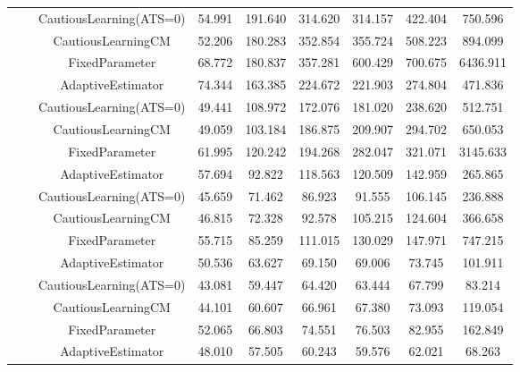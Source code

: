 \begin{table}[!h]
\begin{tabular}[t]{ccccccccc}
 &  & CautiousLearning(ATS=0) & 54.991 & 191.640 & 314.620 & 314.157 & 422.404 & 750.596\\

 &  & CautiousLearningCM & 52.206 & 180.283 & 352.854 & 355.724 & 508.223 & 894.099\\

 & \multirow[t]{-4}{*}{\centering\arraybackslash 0.25} & FixedParameter & 68.772 & 180.837 & 357.281 & 600.429 & 700.675 & 6436.911\\
\cmidrule{2-9}
 &  & AdaptiveEstimator & 74.344 & 163.385 & 224.672 & 221.903 & 274.804 & 471.836\\

 &  & CautiousLearning(ATS=0) & 49.441 & 108.972 & 172.076 & 181.020 & 238.620 & 512.751\\

 &  & CautiousLearningCM & 49.059 & 103.184 & 186.875 & 209.907 & 294.702 & 650.053\\

 & \multirow[t]{-4}{*}{\centering\arraybackslash 0.35} & FixedParameter & 61.995 & 120.242 & 194.268 & 282.047 & 321.071 & 3145.633\\
\cmidrule{2-9}
 &  & AdaptiveEstimator & 57.694 & 92.822 & 118.563 & 120.509 & 142.959 & 265.865\\

 &  & CautiousLearning(ATS=0) & 45.659 & 71.462 & 86.923 & 91.555 & 106.145 & 236.888\\

 &  & CautiousLearningCM & 46.815 & 72.328 & 92.578 & 105.215 & 124.604 & 366.658\\

 & \multirow[t]{-4}{*}{\centering\arraybackslash 0.50} & FixedParameter & 55.715 & 85.259 & 111.015 & 130.029 & 147.971 & 747.215\\
\cmidrule{2-9}
 &  & AdaptiveEstimator & 50.536 & 63.627 & 69.150 & 69.006 & 73.745 & 101.911\\

 &  & CautiousLearning(ATS=0) & 43.081 & 59.447 & 64.420 & 63.444 & 67.799 & 83.214\\

 &  & CautiousLearningCM & 44.101 & 60.607 & 66.961 & 67.380 & 73.093 & 119.054\\

 & \multirow[t]{-4}{*}{\centering\arraybackslash 0.75} & FixedParameter & 52.065 & 66.803 & 74.551 & 76.503 & 82.955 & 162.849\\
\cmidrule{2-9}
 &  & AdaptiveEstimator & 48.010 & 57.505 & 60.243 & 59.576 & 62.021 & 68.263\\


\end{tabular}
\end{table}
